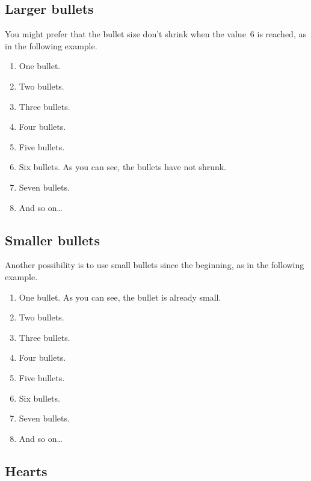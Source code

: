 \documentclass[a4paper]{article}
\begin{document}
\subsection{Larger bullets}

You might prefer that the bullet size don't shrink when the value~6
is reached, as in the following example.

\begin{enumerate}
	\renewcommand*{\theenumi}{\bullcntr{enumi}}
	\renewcommand*{\labelenumi}{\theenumi}
	\largectrbull
	
	\item  One bullet.
	\item  Two bullets.
	\item  Three bullets.
	\item  Four bullets.
	\item  Five bullets.
	\item  Six bullets.  As you can see, the bullets have not shrunk.
	\item  Seven bullets.
	\item  And so on\ldots
\end{enumerate}



\subsection{Smaller bullets}

Another possibility is to use small bullets since the beginning, as in
the following example.

\begin{enumerate}
	\renewcommand*{\theenumi}{\bullcntr{enumi}}
	\renewcommand*{\labelenumi}{\theenumi}
	\smallctrbull
	
	\item  One bullet.  As you can see, the bullet is already small.
	\item  Two bullets.
	\item  Three bullets.
	\item  Four bullets.
	\item  Five bullets.
	\item  Six bullets.
	\item  Seven bullets.
	\item  And so on\ldots
\end{enumerate}



\subsection{Hearts}
\end{document}

